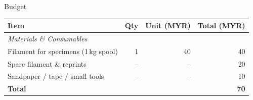 
\begin{frame}{Budget}
  \centering
  \footnotesize

  \begin{tabularx}{\textwidth}{X r r r}
    \toprule
    \textbf{Item} & \textbf{Qty} & \textbf{Unit (MYR)} & \textbf{Total (MYR)} \\
    \midrule
    \multicolumn{4}{l}{\textit{Materials \& Consumables}} \\
    Filament for specimens (1\,kg spool) & 1 & 40  & 40 \\
    Spare filament \& reprints     & -- & --  & 20 \\
    Sandpaper / tape / small tools & -- & --  & 10 \\
    \midrule
    \textbf{Total}   &      &      & \textbf{70} \\
    \bottomrule
  \end{tabularx}

\end{frame}
